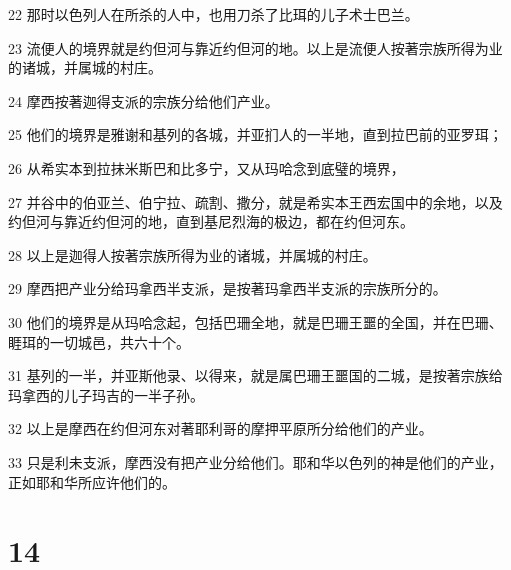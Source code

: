 \par 22 那时以色列人在所杀的人中，也用刀杀了比珥的儿子术士巴兰。
\par 23 流便人的境界就是约但河与靠近约但河的地。以上是流便人按著宗族所得为业的诸城，并属城的村庄。
\par 24 摩西按著迦得支派的宗族分给他们产业。
\par 25 他们的境界是雅谢和基列的各城，并亚扪人的一半地，直到拉巴前的亚罗珥；
\par 26 从希实本到拉抹米斯巴和比多宁，又从玛哈念到底璧的境界，
\par 27 并谷中的伯亚兰、伯宁拉、疏割、撒分，就是希实本王西宏国中的余地，以及约但河与靠近约但河的地，直到基尼烈海的极边，都在约但河东。
\par 28 以上是迦得人按著宗族所得为业的诸城，并属城的村庄。
\par 29 摩西把产业分给玛拿西半支派，是按著玛拿西半支派的宗族所分的。
\par 30 他们的境界是从玛哈念起，包括巴珊全地，就是巴珊王噩的全国，并在巴珊、睚珥的一切城邑，共六十个。
\par 31 基列的一半，并亚斯他录、以得来，就是属巴珊王噩国的二城，是按著宗族给玛拿西的儿子玛吉的一半子孙。
\par 32 以上是摩西在约但河东对著耶利哥的摩押平原所分给他们的产业。
\par 33 只是利未支派，摩西没有把产业分给他们。耶和华以色列的神是他们的产业，正如耶和华所应许他们的。

\chapter{14}

